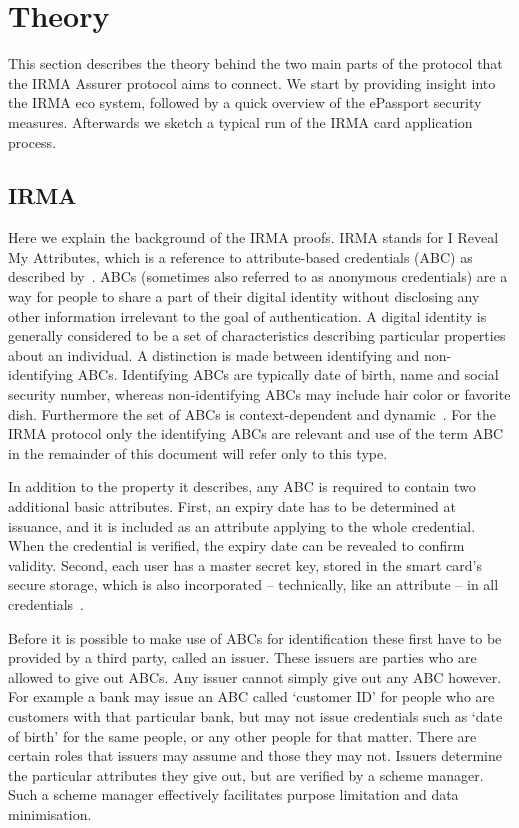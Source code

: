 \chapter{Theory}
\label{sec:theory}
This section describes the theory behind the two main parts of the protocol that the IRMA Assurer protocol aims to connect. We start by providing insight into the IRMA eco system, followed by a quick overview of the ePassport security measures. Afterwards we sketch a typical run of the IRMA card application process.

\section{IRMA}
Here we explain the background of the IRMA proofs. IRMA stands for I Reveal My Attributes, which is a reference to attribute-based credentials (ABC) as described by~\cite{zeroknowledgeprotocols,abcfortrust,alpar2013credential}. ABCs (sometimes also referred to as anonymous credentials) are a way for people to share a part of their digital identity without disclosing any other information irrelevant to the goal of authentication. A digital identity is generally considered to be a set of characteristics describing particular properties about an individual. A distinction is made between identifying and non-identifying ABCs. Identifying ABCs are typically date of birth, name and social security number, whereas non-identifying ABCs may include hair color or favorite dish. Furthermore the set of ABCs is context-dependent and dynamic~\cite{abcofabc}. For the IRMA protocol only the identifying ABCs are relevant and use of the term ABC in the remainder of this document will refer only to this type.

In addition to the property it describes, any ABC is required to contain two additional basic attributes. First, an expiry date has to be determined at issuance, and it is included as an attribute applying to the whole credential. When the credential is verified, the expiry date can be revealed to confirm validity. Second, each user has a master secret key, stored in the smart card's secure storage, which is also incorporated -- technically, like an attribute -- in all credentials~\cite{alpar2013credential}.

Before it is possible to make use of ABCs for identification these first have to be provided by a third party, called an issuer. These issuers are parties who are allowed to give out ABCs. Any issuer cannot simply give out any ABC however. For example a bank may issue an ABC called `customer ID' for people who are customers with that particular bank, but may not issue credentials such as `date of birth' for the same people, or any other people for that matter. There are certain roles that issuers may assume and those they may not. Issuers determine the particular attributes they give out, but are verified by a scheme manager. Such a scheme manager effectively facilitates purpose limitation and data minimisation.

